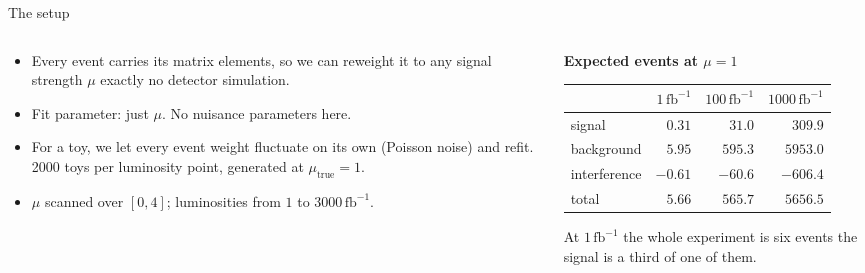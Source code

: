 \documentclass[aspectratio=169, 11pt]{beamer}
\newcommand{\mutrue}{\mu_{\mathrm{true}}}
\newcommand{\fb}{\,\mathrm{fb}^{-1}}
\begin{document}
\begin{frame}{The setup}

  \begin{columns}[T, onlytextwidth]
    \begin{column}{0.55\textwidth}
      \begin{itemize}\small
        \item Every event carries its matrix elements, so we can reweight it to any signal
          strength $\mu$ exactly \textemdash{} no detector simulation.
        \item Fit parameter: just $\mu$. No nuisance parameters here.
        \item For a toy, we let every event weight fluctuate on its own (Poisson noise) and refit.
          2000 toys per luminosity point, generated at $\mutrue = 1$.
        \item $\mu$ scanned over $[0,4]$; luminosities from $1$ to $3000\fb$.
      \end{itemize}
    \end{column}
    \begin{column}{0.41\textwidth}
      \footnotesize
      \textbf{Expected events at $\mu = 1$}
      \vspace{0.15cm}

      \begin{tabular}{@{}l@{\hskip 0.7em}r@{\hskip 0.7em}r@{\hskip 0.7em}r@{}}
        \hline
                     & $1\fb$  & $100\fb$ & $1000\fb$ \\
        \hline
        signal       & $0.31$  & $31.0$   & $309.9$ \\
        background   & $5.95$  & $595.3$  & $5953.0$ \\
        interference & $-0.61$ & $-60.6$  & $-606.4$ \\
        \hline
        total        & $5.66$  & $565.7$  & $5656.5$ \\
        \hline
      \end{tabular}

      \vspace{0.1cm}
      At $1\fb$ the whole experiment is \num{six events} \textemdash{} the signal is a third of
      one of them.
    \end{column}
  \end{columns}

\end{frame}
\end{document}
